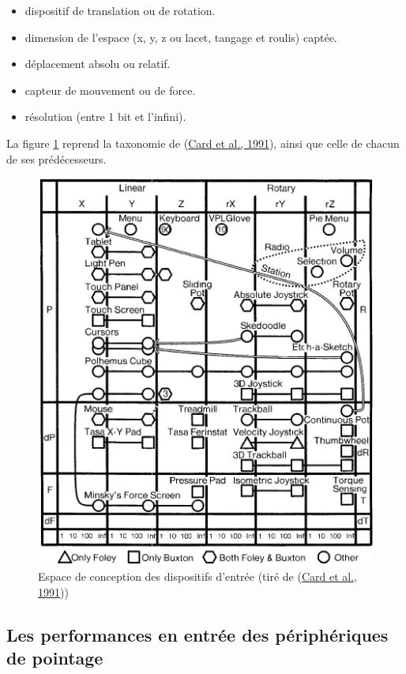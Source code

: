 \documentclass[
]{book}
\providecommand{\tightlist}{%
  \setlength{\itemsep}{0pt}\setlength{\parskip}{0pt}}
\begin{document}
\begin{itemize}
\tightlist
\item
  dispositif de translation ou de rotation.
\item
  dimension de l'espace (x, y, z ou lacet, tangage et
  roulis) captée.
\item
  déplacement absolu ou relatif.
\item
  capteur de mouvement ou de force.
\item
  résolution (entre 1 bit et l'infini).
\end{itemize}

La figure \ref{fig:Espacedeconception} reprend la taxonomie de
(\protect\hyperlink{ref-card1991morphological}{Card et al., 1991}), ainsi que celle de chacun de ses prédécesseurs.

\begin{figure}
\centering
\includegraphics{img/cards.png}
\caption{\label{fig:Espacedeconception}Espace de conception des dispositifs d'entrée (tiré de
(\protect\hyperlink{ref-card1991morphological}{Card et al., 1991}))}
\end{figure}

\hypertarget{performances}{%
\subsection{Les performances en entrée des périphériques de pointage}\label{performances}}
\end{document}
